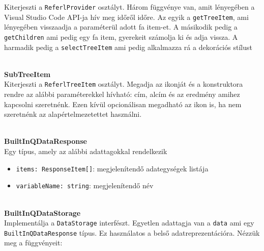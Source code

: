 Kiterjeszti a \lstinline{ReferlProvider} osztályt. Három függvénye van, amit lényegében a Visual Studio Code API-ja hív meg időről időre. Az egyik a \lstinline{getTreeItem}, ami lényegében visszaadja a paraméterül adott fa item-et. A másikodik pedig a \lstinline{getChildren} ami pedig egy fa item, gyerekeit számolja ki és adja vissza. A harmadik pedig a \lstinline{selectTreeItem} ami pedig alkalmazza rá a dekorációs stílust








\\
\vspace{14pt}
\textbf{SubTreeItem}
\\

Kiterjeszti a \lstinline{ReferlTreeItem} osztályt. Megadja az ikonját és a konstruktora rendre az alábbi paraméterekkel hívható: cím, alcím és az eredmény amihez kapcsolni szeretnénk. Ezen kívül opcionálisan megadható az ikon is, ha nem szeretnénk az alapértelmezetettet használni.





\\
\vspace{14pt}
\textbf{BuiltInQDataResponse}
\\


Egy típus, amely az alábbi adattagokkal rendelkezik

\begin{itemize}
    \item \lstinline{items: ResponseItem[]}: megjelenítendő adategységek listája
    
    \item \lstinline{variableName: string}: megjelenítendő név 
\end{itemize}



\\
\vspace{14pt}
\textbf{BuiltInQDataStorage}
\\

Implementálja a \lstinline{DataStorage} interfészt. Egyetlen adattagja van a \lstinline{data} ami egy \lstinline{BuiltInQDataResponse} típus. Ez használatos a belső adatreprezentációra. Nézzük meg a függvényeit:

